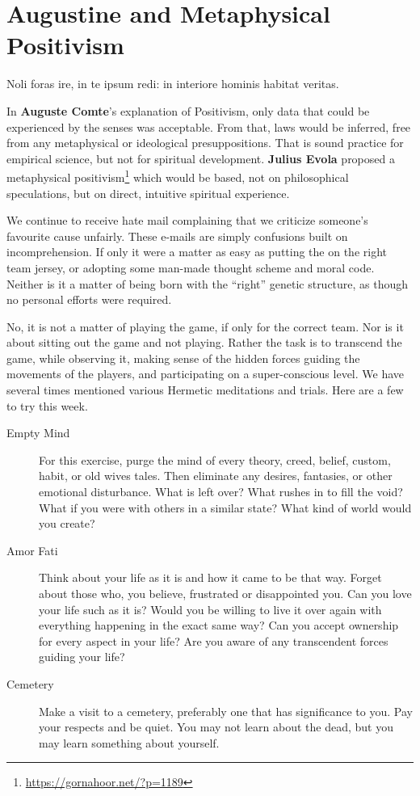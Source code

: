 \section{Augustine and Metaphysical Positivism}

\begin{quotex}
Noli foras ire, in te ipsum redi: in interiore hominis habitat veritas.
\end{quotex}


In \textbf{Auguste Comte}'s explanation of Positivism, only data that could be experienced by the senses was acceptable. From that, laws would be inferred, free from any metaphysical or ideological presuppositions. That is sound practice for empirical science, but not for spiritual development. \textbf{Julius Evola} proposed a metaphysical positivism\footnote{\url{https://gornahoor.net/?p=1189}} which would be based, not on philosophical speculations, but on direct, intuitive spiritual experience.

We continue to receive hate mail complaining that we criticize someone's favourite cause unfairly. These e-mails are simply confusions built on incomprehension. If only it were a matter as easy as putting the on the right team jersey, or adopting some man-made thought scheme and moral code. Neither is it a matter of being born with the ``right'' genetic structure, as though no personal efforts were required.

No, it is not a matter of playing the game, if only for the correct team. Nor is it about sitting out the game and not playing. Rather the task is to transcend the game, while observing it, making sense of the hidden forces guiding the movements of the players, and participating on a super-conscious level. We have several times mentioned various Hermetic meditations and trials. Here are a few to try this week.


\begin{description}

\item[Empty Mind]

For this exercise, purge the mind of every theory, creed, belief, custom, habit, or old wives tales. Then eliminate any desires, fantasies, or other emotional disturbance. What is left over? What rushes in to fill the void? What if you were with others in a similar state? What kind of world would you create?
\item[Amor Fati]

Think about your life as it is and how it came to be that way. Forget about those who, you believe, frustrated or disappointed you. Can you love your life such as it is? Would you be willing to live it over again with everything happening in the exact same way? Can you accept ownership for every aspect in your life? Are you aware of any transcendent forces guiding your life?
\item[Cemetery]

Make a visit to a cemetery, preferably one that has significance to you. Pay your respects and be quiet. You may not learn about the dead, but you may learn something about yourself.
\end{description}


